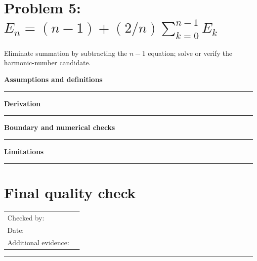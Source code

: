 \documentclass[11pt]{article}
\begin{document}
\section{\texorpdfstring{Problem 5: $E_n=(n-1)+(2/n)\sum_{k=0}^{n-1}E_k$}{Problem 5: Expected-cost recurrence with a summation}}
Eliminate summation by subtracting the $n-1$ equation; solve or verify the harmonic-number candidate.\par\medskip
\textbf{Assumptions and definitions}\par\vspace{0.7cm}\hrule\vspace{0.35cm}
\textbf{Derivation}\par\vspace{2.1cm}\hrule\vspace{0.3cm}
\textbf{Boundary and numerical checks}\par\vspace{1.1cm}\hrule\vspace{0.35cm}
\textbf{Limitations}\par\vspace{0.9cm}\hrule\vspace{0.35cm}
\clearpage
\section{Final quality check}
\begin{tabularx}{\linewidth}{@{}lX@{}}Checked by: & \hrulefill\\ Date: & \hrulefill\\ Additional evidence: & \hrulefill\\\end{tabularx}
\vspace{3cm}\hrule
\end{document}
